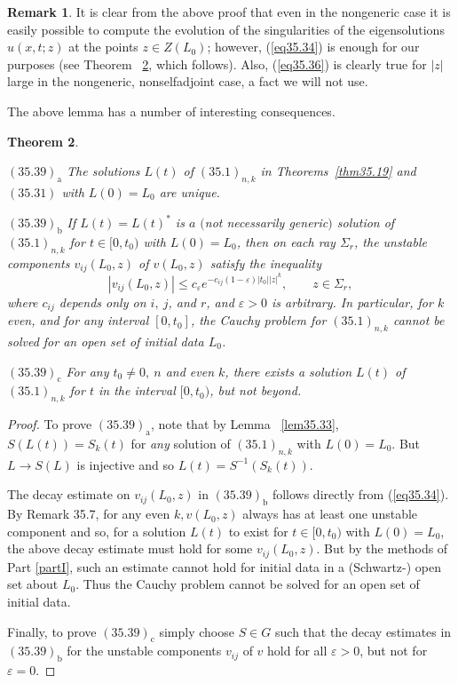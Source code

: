 \documentclass{surv-l}
\theoremstyle{plain}
\newtheorem{theorem}{Theorem}[section]
\theoremstyle{definition}
\newtheorem{remark}[theorem]{Remark}
\numberwithin{equation}{chapter}
\begin{document}
\setcounter{theorem}{37}
\begin{remark}\label{rem35.38}
It is clear from the above proof that even in the nongeneric case it is easily possible to compute the evolution of the singularities of the eigensolutions $u(x, t;z)$ at the points $z\in Z(L_{0})$; however, (\ref{eq35.34}) is enough for our purposes (see Theorem ~\ref{thm35.39}, which follows). Also, (\ref{eq35.36}) is clearly true for $|z|$ large in the nongeneric, nonselfadjoint case, a fact we will not use.
\end{remark}

The above lemma has a number of interesting consequences.

\begin{theorem}\label{thm35.39}

$(35.39)_{\mathrm{a}}$ The solutions $L(t)$ of $(35.1)_{n, k}$ in
Theorems~\ref{thm35.19} and $(35.31)$ with $L(0)=L_{0}$ are unique.

$(35.39)_{\mathrm{b}}$ If $L(t)=L(t)^{*}$ is $a$ $($not necessarily generic$)$ solution of $(35.1)_{n,k}$ for $t\in[0, t_{0})$ with $L(0)=L_{0}$, then on each ray $\Sigma_{r}$, the unstable components $v_{ij}(L_{0}, z)$ of $v(L_{0}, z)$ satisfy the inequality
\begin{equation*}
|v_{ij}(L_{0}, z)|\leq c_{\varepsilon}e^{-c_{ij}(1-\varepsilon)|t_{0}||z|^{k}},\qquad z\in\Sigma_{r},
\end{equation*}
where $c_{ij}$ depends only on $i,\ j$, and $r$, and $\varepsilon >0$ is arbitrary. In particular, for $k$ even, and for any interval $[0, t_{0}]$, the Cauchy problem for $(35.1)_{n,k}$ cannot be solved for an open set of initial data $L_{0}$.

$(35.39)_{\mathrm{c}}$ For any $t_{0}\neq 0,\ n$ and even $k$, there exists a solution $L(t)$ of $(35.1)_{n,k}$ for $t$ in the interval $[0, t_{0})$, but not beyond.
\end{theorem}
\begin{proof}
To prove $(35.39)_{\mathrm{a}}$, note that by Lemma ~\ref{lem35.33}, $S(L(t))=S_{k}(t)$ for \emph{any} solution of $(35.1)_{n,k}$ with $L(0)=L_{0}$. But $L\rightarrow S(L)$ is injective and so $L(t)=S^{-1}(S_{k}(t))$.

The decay estimate on $v_{ij}(L_{0}, z)$ in $(35.39)_{\mathrm{b}}$ follows directly from (\ref{eq35.34}). By Remark 35.7, for any even $k,v(L_{0}, z)$ always has at least one unstable component and so, for a solution $L(t)$ to exist for $t\in[0,t_{0})$ with $L(0)=L_{0}$, the above decay estimate must hold for some $v_{ij}(L_{0}, z)$. But by the methods of Part \ref{partI}, such an estimate cannot hold for initial data in a (Schwartz-) open set about $L_{0}$. Thus the Cauchy problem cannot be solved for an open set of initial data.

Finally, to prove $(35.39)_{\mathrm{c}}$ simply choose $S\in G$ such that the decay estimates in $(35.39)_{\mathrm{b}}$ for the unstable components $v_{ij}$ of $v$ hold for all $\varepsilon >0$, but not for $\varepsilon =0$.\quad
\end{proof}
\end{document}
